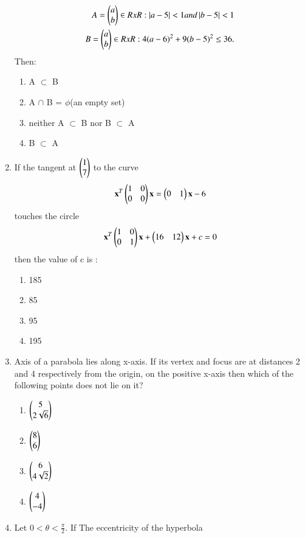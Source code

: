\documentclass[journal,12pt,twocolumn]{IEEEtran}
\begin{document}
\begin{enumerate}[label=\arabic*]
    \begin{align}
    A = {\begin{pmatrix}a\\b\end{pmatrix}\in R x R: \left\vert a-5\right\vert<1 and \left\vert b-5\right\vert <1}\\
    B = {\begin{pmatrix}a\\b\end{pmatrix}\in R x R:4(a-6)^2+9(b-5)^2\leq 36}.
    \end{align} Then:
    \begin{enumerate}
    \item A $\subset$ B 
    \item A $\cap$ B = $\phi$(an empty set)
    \item neither A $\subset$ B nor B $\subset$ A
    \item B $\subset$ A
    \end{enumerate}
    \item If the tangent at $\begin{pmatrix}1\\7\end{pmatrix}$ to the curve 
    \begin{align}
    \mathbf{x}^T\begin{pmatrix}1&0\\0&0\end{pmatrix}\mathbf{x}=\begin{pmatrix}0&1\end{pmatrix}\mathbf{x}-6
    \end{align} touches the circle 
    \begin{align}
    \mathbf{x}^T\begin{pmatrix}1&0\\0&1\end{pmatrix}\mathbf{x}+\begin{pmatrix}16&12\end{pmatrix}\mathbf{x}+c=0
    \end{align} then the value of c is :
    \begin{enumerate}
    \item 185
    \item 85
    \item 95
    \item 195
    \end{enumerate}
    \item Axis of a parabola lies along x-axis. If its vertex and focus are at distances 2 and 4 respectively from the origin, on the positive x-axis then which of the following points does not lie on it?
    \begin{enumerate}
    \item $\begin{pmatrix}5\\2\sqrt{6}\end{pmatrix}$
    \item $\begin{pmatrix}8\\6\end{pmatrix}$
    \item $\begin{pmatrix}6\\4\sqrt{2}\end{pmatrix}$
    \item $\begin{pmatrix}4\\-4\end{pmatrix}$
    \end{enumerate}
    \item Let $0<\theta<\frac{\pi}{2}$. If The eccentricity of the hyperbola

\end{enumerate}
\end{document}
